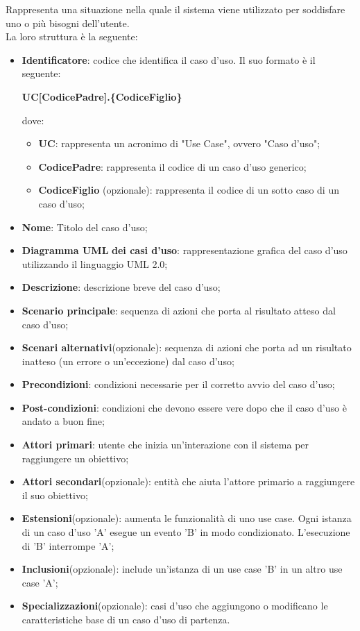 Rappresenta una situazione nella quale il sistema viene utilizzato per soddisfare uno o più bisogni dell'utente.\\
La loro struttura è la seguente:
\begin{itemize}
\item \textbf{Identificatore}: codice che identifica il caso d'uso. Il suo formato è il seguente:
\begin{center}
\textbf{UC[CodicePadre].\{CodiceFiglio\}}\\
\end{center}
dove:
\begin{itemize}
\item \textbf{UC}: rappresenta un acronimo di "Use Case", ovvero "Caso d'uso";
\item \textbf{CodicePadre}: rappresenta il codice di un caso d'uso generico;
\item \textbf{CodiceFiglio} (opzionale): rappresenta il codice di un sotto caso di un caso d'uso;
\end{itemize}
\item \textbf{Nome}: Titolo del caso d'uso;
\item \textbf{Diagramma UML} \textbf{dei casi d'uso}: rappresentazione grafica del caso d'uso utilizzando il linguaggio UML 2.0; 
\item \textbf{Descrizione}: descrizione breve del caso d'uso;
\item \textbf{Scenario principale}: sequenza di azioni che porta al risultato atteso dal caso d'uso;
\item \textbf{Scenari alternativi}(opzionale): sequenza di azioni che porta ad un risultato inatteso (un errore o un'eccezione) dal caso d'uso;
\item \textbf{Precondizioni}: condizioni necessarie per il corretto avvio del caso d'uso;
\item \textbf{Post-condizioni}: condizioni che devono essere vere dopo che il caso d'uso è andato a buon fine;
\item \textbf{Attori primari}: utente che inizia un'interazione con il sistema per raggiungere un obiettivo;
\item \textbf{Attori secondari}(opzionale): entità che aiuta l'attore primario a raggiungere il suo obiettivo;
\item \textbf{Estensioni}(opzionale): aumenta le funzionalità di uno use case. Ogni istanza di un caso d'uso 'A' esegue un evento 'B' in modo condizionato. L'esecuzione di 'B' interrompe 'A';
\item \textbf{Inclusioni}(opzionale): include un'istanza di un use case 'B' in un altro use case 'A';
\item \textbf{Specializzazioni}(opzionale): casi d'uso che aggiungono o modificano le caratteristiche base di un caso d'uso di partenza.
\end{itemize}